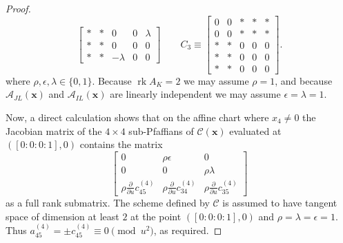 \documentclass[10pt,a4paper]{amsart}
\DeclareMathOperator{\rank}{rk}
\newcommand{\K}{K}
\newcommand{\cA}{\mathcal{A}}
\renewcommand{\L}{L}
\begin{document}
\begin{proof}
\begin{equation*}
\begin{bmatrix}
      * & * & 0 & 0 & \lambda \\
      * & * & 0 & 0 & 0 \\
      * & * & -\lambda & 0 & 0 
  \end{bmatrix}
  \qquad
  C_3 \equiv \begin{bmatrix}
      0 & 0 & * & * & * \\
      0 & 0 & * & * & * \\
      * & * & 0 & 0 & 0 \\
      * & * & 0 & 0 & 0 \\
      * & * & 0 & 0 & 0 
  \end{bmatrix}.
\end{equation*}
where $\rho, \epsilon,\lambda \in \{0,1\}$. Because $\rank A_{\K} = 2$ we may assume $\rho = 1$, and because $\cA_{J\L}(\textbf{x})$ and $\cA_{I\L}(\textbf{x})$ are linearly independent we may assume $\epsilon = \lambda = 1$.

Now, a direct calculation shows that on the affine chart where $x_4 \neq 0$ the Jacobian matrix of the $4 \times 4$ sub-Pfaffians of ${\mathcal{C}}(\mathbf{x})$ evaluated at $([0:0:0:1], 0)$ contains the matrix 
\[
\begin{bmatrix}
    0 & \rho \epsilon & 0 \\
    0 & 0 & \rho \lambda \\
    \rho \tfrac{\partial}{\partial u} c_{45}^{(4)} & \rho\tfrac{\partial}{\partial u} c_{34}^{(4)}  & \rho \tfrac{\partial}{\partial u} c_{35}^{(4)}  
\end{bmatrix}
\]
as a full rank submatrix. The scheme defined by $\mathcal{C}$ is assumed to have tangent space of dimension at least $2$ at the point $([0:0:0:1], 0)$ and $\rho = \lambda = \epsilon = 1$. Thus $a_{45}^{(4)} = \pm c_{45}^{(4)} \equiv 0 \pmod{u^2}$, as required.
\end{proof}
\end{document}
